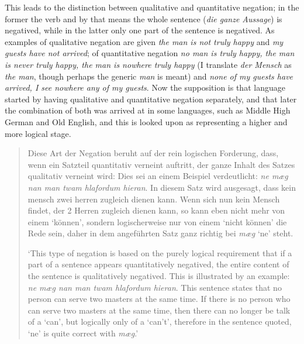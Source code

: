This leads to the distinction between qualitative and quantitative negation; in the former the verb and by that means the whole sentence (\textit{die ganze Aussage}) is negatived, while in the latter only one part of the sentence is negatived. As examples of qualitative negation are given \textit{the man is not truly happy} and \textit{my guests have not arrived}; of quantitative negation \textit{no man is truly happy, the man is never truly happy, the man is nowhere truly happy} (I translate \textit{der Mensch} as \textit{the man}, though perhaps the generic \textit{man} is meant) and \textit{none of my guests have arrived, I see nowhere any of my guests}. Now the supposition is that language started by having qualitative and quantitative negation separately, and that later the combination of both was arrived at in some languages, such as Middle High German and Old English, and this is looked upon as representing a higher and more logical stage.

\begin{quote}
Diese Art der Negation beruht auf der rein logischen Forderung, dass, wenn ein Satzteil quantitativ verneint auftritt, der ganze Inhalt des Satzes qualitativ verneint wird: Dies sei an einem Beispiel verdeutlicht: \textit{ne mæg nan man twam hlafordum hieran}. In diesem Satz wird ausgesagt, dass kein mensch zwei herren zugleich dienen kann. Wenn sich nun kein Mensch findet, der 2 Herren zugleich dienen kann, so kann eben nicht mehr von einem `können', sondern logischerweise nur von einem `nicht können' die Rede sein, daher in dem angeführten Satz ganz richtig bei \textit{mæg} `ne' steht.

`This type of negation is based on the purely logical requirement that if a part of a sentence appears quantitatively negatived, the entire content of the sentence is qualitatively negatived. This is illustrated by an example: \textit{ne mæg nan man twam hlafordum hieran}. This sentence states that no person can serve two masters at the same time. If there is no person who can serve two masters at the same time, then there can no longer be talk of a `can', but logically only of a `can't', therefore in the sentence quoted, `ne' is quite correct with \textit{mæg}.'\hfill\citep[76]{rauert1910negation} 
\end{quote}%

